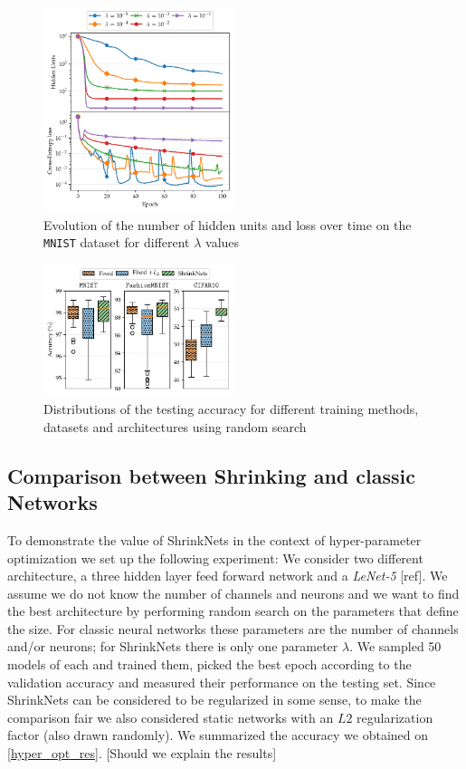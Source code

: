 \documentclass[sigconf]{acmart}
\begin{document}
\begin{figure}
\begin{center}
\includegraphics[width=0.5\textwidth]{convergence}
\caption{Evolution of the number of hidden units and loss over time on the \texttt{MNIST} dataset for different $\lambda$ values \label{convergence_plot}}
\end{center}
\end{figure}

\begin{figure}
\begin{center}
  \includegraphics[width=0.5\textwidth]{hyper_opt}
\caption{Distributions of the testing accuracy for different training methods, datasets and architectures using random search\label{hyper_opt_res}}
\end{center}
\end{figure}

\subsection{Comparison between Shrinking and classic Networks}

To demonstrate the value of ShrinkNets in the context of hyper-parameter optimization we set up the following experiment: We consider two different architecture, a three hidden layer feed forward network and a \textit{LeNet-5} [ref]. We assume we do not know the number of channels and neurons and we want to find the best architecture by performing random search on the parameters that define the size. For classic neural networks these parameters are the number of channels and/or neurons; for ShrinkNets there is only one parameter $\lambda$. We sampled 50 models of each and trained them, picked the best epoch according to the validation accuracy and measured their performance on the testing set. Since ShrinkNets can be considered to be regularized in some sense, to make the comparison fair we also considered static networks with an $L2$ regularization factor (also drawn randomly). We summarized the accuracy we obtained on \autoref{hyper_opt_res}. [Should we explain the results]
\end{document}
